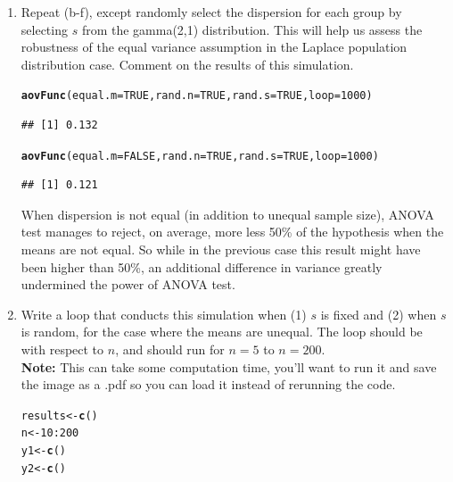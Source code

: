 \documentclass{article}\usepackage[]{graphicx}\usepackage[]{color}
\makeatletter
\newcommand{\hlnum}[1]{\textcolor[rgb]{0.686,0.059,0.569}{#1}}%
\newcommand{\hlopt}[1]{\textcolor[rgb]{0,0,0}{#1}}%
\newcommand{\hlstd}[1]{\textcolor[rgb]{0.345,0.345,0.345}{#1}}%
\newcommand{\hlkwb}[1]{\textcolor[rgb]{0.69,0.353,0.396}{#1}}%
\newcommand{\hlkwc}[1]{\textcolor[rgb]{0.333,0.667,0.333}{#1}}%
\newcommand{\hlkwd}[1]{\textcolor[rgb]{0.737,0.353,0.396}{\textbf{#1}}}%
\newenvironment{kframe}{%
 \def\at@end@of@kframe{}%
 \ifinner\ifhmode%
  \def\at@end@of@kframe{\end{minipage}}%
  \begin{minipage}{\columnwidth}%
 \fi\fi%
 \def\FrameCommand##1{\hskip\@totalleftmargin \hskip-\fboxsep
 \colorbox{shadecolor}{##1}\hskip-\fboxsep
     \hskip-\linewidth \hskip-\@totalleftmargin \hskip\columnwidth}%
 \MakeFramed {\advance\hsize-\width
   \@totalleftmargin\z@ \linewidth\hsize
   \@setminipage}}%
 {\par\unskip\endMakeFramed%
 \at@end@of@kframe}
\newenvironment{knitrout}{}{} %
\makeatother
\begin{document}
\begin{enumerate}
\begin{enumerate}
\item Repeat (b-f), except randomly select the dispersion for each 
  group by selecting $s$ from the gamma(2,1) distribution. This 
  will help us assess the robustness of the equal variance assumption
  in the Laplace population distribution case. Comment on the results of 
  this simulation.
\begin{knitrout}
\color{fgcolor}\begin{kframe}
\begin{alltt}
\hlkwd{aovFunc}\hlstd{(}\hlkwc{equal.m}\hlstd{=}\hlnum{TRUE}\hlstd{,} \hlkwc{rand.n}\hlstd{=}\hlnum{TRUE}\hlstd{,} \hlkwc{rand.s}\hlstd{=}\hlnum{TRUE}\hlstd{,} \hlkwc{loop}\hlstd{=}\hlnum{1000}\hlstd{)}
\end{alltt}
\begin{verbatim}
## [1] 0.132
\end{verbatim}
\begin{alltt}
\hlkwd{aovFunc}\hlstd{(}\hlkwc{equal.m}\hlstd{=}\hlnum{FALSE}\hlstd{,} \hlkwc{rand.n}\hlstd{=}\hlnum{TRUE}\hlstd{,} \hlkwc{rand.s}\hlstd{=}\hlnum{TRUE}\hlstd{,} \hlkwc{loop}\hlstd{=}\hlnum{1000}\hlstd{)}
\end{alltt}
\begin{verbatim}
## [1] 0.121
\end{verbatim}
\end{kframe}
\end{knitrout}
When dispersion is not equal (in addition to unequal sample size), ANOVA test manages to reject, on average, more less 50\% of the hypothesis when the means are not equal. So while in the previous case this result might have been higher than 50\%, an additional difference in variance greatly undermined the power of ANOVA test.

\item Write a loop that conducts this simulation when (1) $s$ is fixed and (2) 
when $s$ is random, for the case where the means are unequal. The loop should be 
with respect to $n$, and should run for $n=5$ to $n=200$.\\
\textbf{Note:} This can take some computation time, you'll want to run it and save 
the image as a .pdf so you can load it instead of rerunning the code.
\begin{knitrout}
\color{fgcolor}\begin{kframe}
\begin{alltt}
\hlstd{results}\hlkwb{<-}\hlkwd{c}\hlstd{()}
\hlstd{n}\hlkwb{<-}\hlnum{10}\hlopt{:}\hlnum{200}
\hlstd{y1}\hlkwb{<-}\hlkwd{c}\hlstd{()}
\hlstd{y2}\hlkwb{<-}\hlkwd{c}\hlstd{()}


\end{alltt}
\end{kframe}
\end{knitrout}
\end{enumerate}
\end{enumerate}
\end{document}
